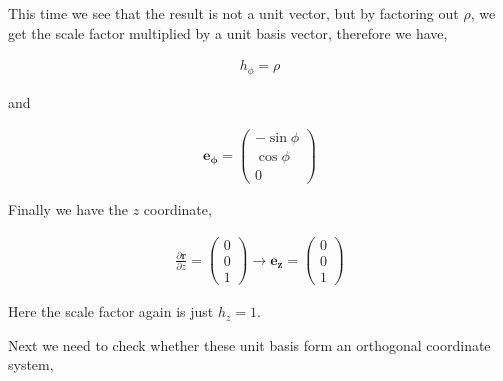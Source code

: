 \documentclass[11pt]{amsart}
\begin{document}
This time we see that the result is not a unit vector, but by factoring out $\rho$, we get the scale factor multiplied by a unit basis vector, therefore we have,

\begin{align*}
  h_{\phi} = \rho
\end{align*}

and

\begin{align*}
  \mathbf{e_{\phi}} =
  \begin{pmatrix}
    -\sin\phi \\
    \cos\phi \\
    0
  \end{pmatrix}
\end{align*}

Finally we have the $z$ coordinate,

\begin{align*}
  \frac{\partial\mathbf{r}}{\partial z} =
  \begin{pmatrix}
    0 \\
    0 \\
    1
  \end{pmatrix} \to
  \mathbf{e_z} =
  \begin{pmatrix}
    0 \\
    0 \\
    1
  \end{pmatrix}
\end{align*}

Here the scale factor again is just $h_z = 1$.

Next we need to check whether these unit basis form an orthogonal coordinate system,
\end{document}
